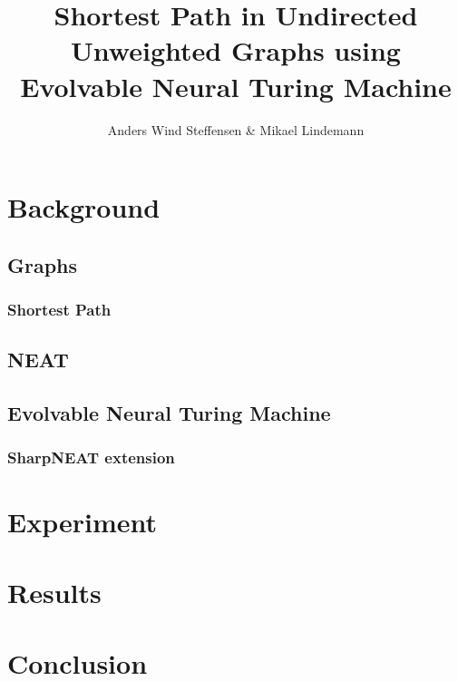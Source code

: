 \documentclass{article}
\author{Anders Wind Steffensen \& Mikael Lindemann}
\title{Shortest Path in Undirected Unweighted Graphs using Evolvable Neural Turing Machine}
\begin{document}
\maketitle
\tableofcontents
\newpage
\section{Background}
\subsection{Graphs}
\subsubsection{Shortest Path}
\subsection{NEAT}
\subsection{Evolvable Neural Turing Machine}
\subsubsection{SharpNEAT extension}
\section{Experiment}
\section{Results}
\section{Conclusion}
\end{document}
